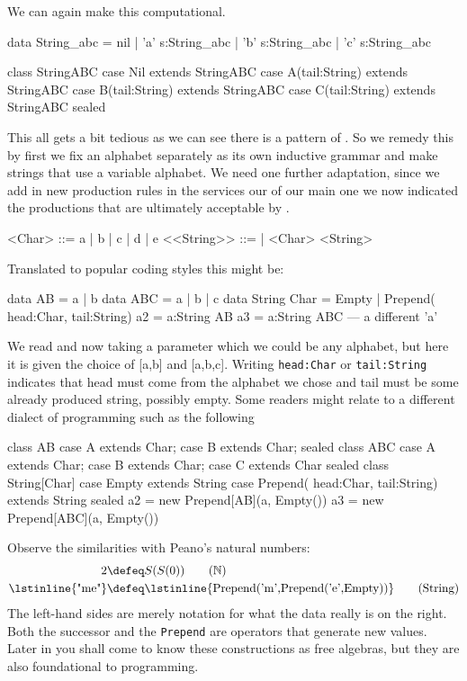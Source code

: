 We can again make this computational.
\begin{Fcode}[]
data String_abc = nil
            | 'a' s:String_abc
            | 'b' s:String_abc
            | 'c' s:String_abc
\end{Fcode}
\begin{Pcode}[]
class StringABC
  case Nil extends StringABC
  case A(tail:String) extends StringABC
  case B(tail:String) extends StringABC
  case C(tail:String) extends StringABC
sealed
\end{Pcode}
    
This all gets a bit tedious as we can see there is a pattern of
.  So we remedy this by first we fix an alphabet
separately as its own inductive grammar and make strings that use a variable alphabet.
We need one further adaptation, since we add in new production rules in 
the services our of our main one we now indicated the productions 
that are ultimately acceptable by .
\begin{Gcode}[]
<Char> ::= a | b | c | d | e
<<String>> ::= 
           | <Char> <String>
\end{Gcode}
Translated to popular coding styles this might be:
\begin{Fcode}[]
data AB = a | b
data ABC = a | b | c 
data String Char = Empty 
            | Prepend( head:Char, tail:String) 
a2 = a:String AB
a3 = a:String ABC --- a different 'a'
\end{Fcode}
We read  and now taking a parameter 
which we could be any alphabet, but here it is given the 
choice of [a,b] and [a,b,c].
Writing \lstinline{head:Char} or \lstinline{tail:String} 
indicates that head must come from the alphabet we chose 
and tail must be some already produced string, possibly empty.
Some readers might relate to a different dialect of 
programming such as the following
\begin{Pcode}[]
class AB
  case A extends Char;  case B extends Char;
sealed
class ABC
  case A extends Char;  case B extends Char;
  case C extends Char
sealed
class String[Char]
  case Empty extends String
  case Prepend( head:Char, tail:String) extends String
sealed
a2 = new Prepend[AB](a, Empty())
a3 = new Prepend[ABC](a, Empty())
\end{Pcode}
Observe the similarities with Peano's natural numbers:
\begin{align}
     2 & \defeq S(S(0)) \tag{$\mathbb{N}$}\\
 \text{\lstinline{"me"}} & \defeq \text{\lstinline{Prepend('m',Prepend('e',Empty))}}
\tag{String}
\end{align}
The left-hand sides are merely notation for what the data really is on the right.
Both the successor and the \lstinline{Prepend} are operators that generate 
new values.  Later in you shall come to know these constructions as free algebras,
but they are also foundational to programming.




